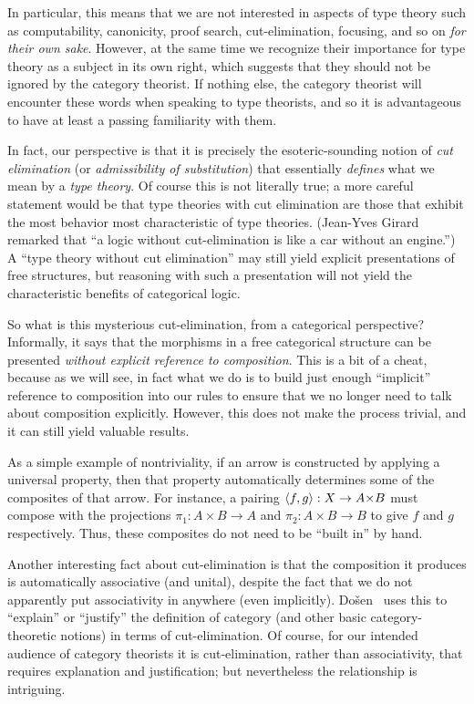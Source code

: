 In particular, this means that we are not interested in aspects of type theory such as computability, canonicity, proof search, cut-elimination, focusing, and so on \emph{for their own sake}.
However, at the same time we recognize their importance for type theory as a subject in its own right, which suggests that they should not be ignored by the category theorist.
If nothing else, the category theorist will encounter these words when speaking to type theorists, and so it is advantageous to have at least a passing familiarity with them.

In fact, our perspective is that it is precisely the esoteric-sounding notion of \emph{cut elimination} (or \emph{admissibility of substitution}) that essentially \emph{defines} what we mean by a \emph{type theory}.
Of course this is not literally true; a more careful statement would be that type theories with cut elimination are those that exhibit the most behavior most characteristic of type theories.
(Jean-Yves Girard remarked that ``a logic without cut-elimination is like a car without an engine.'')
A ``type theory without cut elimination'' may still yield explicit presentations of free structures, but reasoning with such a presentation will not yield the characteristic benefits of categorical logic.

So what is this mysterious cut-elimination, from a categorical perspective?
Informally, it says that the morphisms in a free categorical structure can be presented \emph{without explicit reference to composition}.
This is a bit of a cheat, because as we will see, in fact what we do is to build just enough ``implicit'' reference to composition into our rules to ensure that we no longer need to talk about composition explicitly.
However, this does not make the process trivial, and it can still yield valuable results.

As a simple example of nontriviality, if an arrow is constructed by applying a universal property, then that property automatically determines some of the composites of that arrow.
For instance, a pairing $\pair{f}{g}:X\to A\times B$ must compose with the projections $\pi_1:A\times B\to A$ and $\pi_2:A\times B\to B$ to give $f$ and $g$ respectively.
Thus, these composites do not need to be ``built in'' by hand.

Another interesting fact about cut-elimination is that the composition it produces is automatically associative (and unital), despite the fact that we do not apparently put associativity in anywhere (even implicitly).
Do\v{s}en~\cite{dosen:cutelim-cats} %
 uses this to ``explain'' or ``justify'' the definition of category (and other basic category-theoretic notions) in terms of cut-elimination.
Of course, for our intended audience of category theorists it is cut-elimination, rather than associativity, that requires explanation and justification; but nevertheless the relationship is intriguing.

